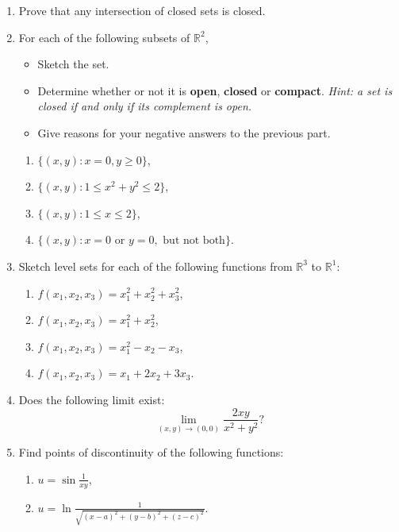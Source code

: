 \documentclass[12pt]{article} %
\theoremstyle{definition} %
\begin{document}
\begin{enumerate}

\item Prove that any intersection of closed sets is closed.

\item For each of the following subsets of $\mathbb{R}^2$,
\begin{itemize}
\item Sketch the set.
\item Determine whether or not it is \textbf{open}, \textbf{closed} or \textbf{compact}. 
\textit{Hint: a set is closed if and only if its complement is open.}
\item Give  reasons for your negative answers to the previous part.
\end{itemize}

\begin{enumerate}
\item $\{(x, y)\colon x=0, y\geqslant 0\}$,
\item $\{(x,y)\colon 1\leqslant x^2+y^2\leqslant 2\}$,
\item $\{(x,y)\colon 1\leqslant x\leqslant 2\}$,
\item $\{(x,y)\colon x=0 \text{ or } y=0, \text{ but not both}\}$.
\end{enumerate}

\item Sketch level sets for each of the following functions from $\mathbb{R}^3$ to $\mathbb{R}^1$:

\begin{enumerate}
\item $f(x_1, x_2, x_3)=x_1^2+x_2^2+x_3^2$,
\item $f(x_1, x_2, x_3)=x_1^2+x_2^2$,
\item $f(x_1, x_2, x_3)=x_1^2-x_2-x_3$,
\item $f(x_1, x_2, x_3)=x_1+2x_2+3x_3$.
\end{enumerate}

\item Does the following limit exist: 
\[
	\lim_{(x,y)\to (0,0)}\frac{2xy}{x^2+y^2}?
\]

\item Find points of discontinuity of the following functions:
\begin{enumerate}
\item $u=\sin\frac1{xy}$,
\item $u=\ln\frac1{\sqrt{(x-a)^2+(y-b)^2+(z-c)^2}}$.
\end{enumerate}

\end{enumerate}
\end{document}
